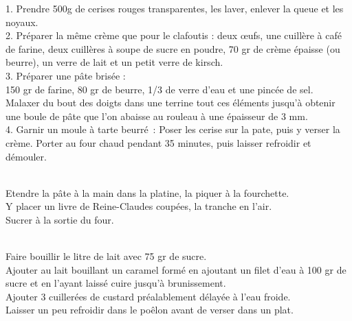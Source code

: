 \begin{minipage}[c]{\textwidth}
1. Prendre 500g de cerises rouges transparentes, les laver, enlever la queue et les noyaux.\\
2. Préparer la même crème que pour le clafoutis : deux œufs, une cuillère à café de farine, deux cuillères à soupe de sucre en poudre, 70 gr de crème épaisse (ou beurre), un verre de lait et un petit verre de kirsch.\\
3. Préparer une pâte brisée :\\
150 gr de farine, 80 gr de beurre, 1/3 de verre d'eau et une pincée de sel.\\
Malaxer du bout des doigts dans une terrine tout ces éléments jusqu’à obtenir une boule de pâte que l’on abaisse au rouleau à une épaisseur de 3 mm.\\
4. Garnir un moule à tarte beurré : Poser les cerise sur la pate, puis y verser la crème. Porter au four chaud pendant 35 minutes, puis laisser refroidir et démouler.\\
\\

\end{minipage}

\begin{minipage}[c]{\textwidth}
Etendre la pâte à la main dans la platine, la piquer à la fourchette.\\
Y placer un livre de Reine-Claudes coupées, la tranche en l'air.\\
Sucrer à la sortie du four.\\
\\

\end{minipage}

\begin{minipage}[c]{\textwidth}
Faire bouillir le litre de lait avec 75 gr de sucre.\\
Ajouter au lait bouillant un caramel formé en ajoutant un filet d’eau à 100 gr de sucre et en l’ayant laissé cuire jusqu’à brunissement. \\
Ajouter 3 cuillerées de custard préalablement délayée à l’eau froide.\\
Laisser un peu refroidir dans le poêlon avant de verser dans un plat.\\
\\

\end{minipage}

